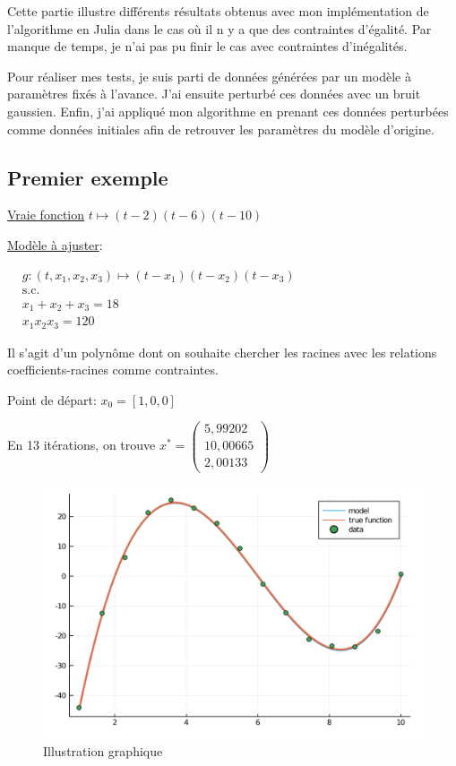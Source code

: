 \documentclass[a4paper,11pt]{article}
\numberwithin{equation}{section}
\begin{document}
Cette partie illustre différents résultats obtenus avec mon implémentation de l'algorithme en Julia dans le cas où il n y a que des contraintes d'égalité. Par manque de temps, je n'ai pas pu finir le cas avec contraintes d'inégalités. 

Pour réaliser mes tests, je suis parti de données générées par un modèle à paramètres fixés à l'avance. J'ai ensuite perturbé ces données avec un bruit gaussien. Enfin, j'ai appliqué mon algorithme en prenant ces données perturbées comme données initiales afin de retrouver les paramètres du modèle d'origine. 

\subsection{Premier exemple}

\underline{Vraie fonction} $t\mapsto (t-2)(t-6)(t-10)$
\newline

\underline{Modèle à ajuster}:

$
\begin{aligned}
&g:(t, x_1, x_2, x_3) \mapsto (t-x_1)(t-x_2)(t-x_3)\\
&\text{s.c.}\\
&x_1+x_2+x_3 = 18 \\
&x_1  x_2  x_3 = 120
\end{aligned}
$

Il s'agit d'un polynôme dont on souhaite chercher les racines avec les relations coefficients-racines comme contraintes.

Point de départ:
$x_{0} = [1, 0, 0]$

En 13 itérations, on trouve 
 $x^{*} = \begin{pmatrix}
5,99202\\
10,00665\\
2,00133
\end{pmatrix}$

\begin{figure}
\centering
\includegraphics[scale=0.6]{images/courbe1}
\caption{Illustration graphique}
\label{fig:courbe1}
\end{figure}
\end{document}
